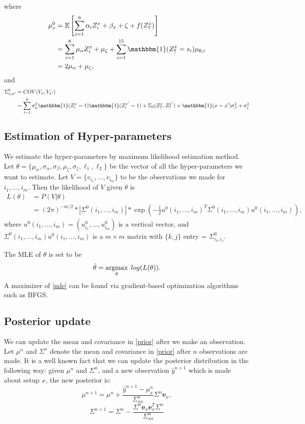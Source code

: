 \documentclass[11pt]{article}
\newcommand{\argmax}{\operatornamewithlimits{argmax}}
\begin{document}
where 
\begin{align*}
\mu^0_x &= \mathbb{E}\left[\sum_{i=1}^{6}\alpha_i Z_i^x + \beta_x + \zeta + f(Z_7^x)\right]\\
& = \sum_{i=1}^{6} \mu_{\alpha}Z^x_i+\mu_{\zeta}+\sum_{i=1}^{15}\mathbbm{1}(Z_7^x=s_i)\mu_{0,i}\\
& = 2\mu_{\alpha} + \mu_{\zeta},
\end{align*}
and
\begin{align*}
\Sigma^0_{x,x'} &= COV(V_x,V_{x'})\\
& =\sum_{i=1}^{6}\sigma_{\alpha}^2\mathbbm{1}(Z_i^{x}=1)\mathbbm{1}(Z_i^{x'}=1) + \Sigma_0(Z^x_7,Z^{x'}_7) + \mathbbm{1}(x=x')\sigma_{\beta}^2 + \sigma^2_{\zeta}
\end{align*}
\subsection{Estimation of Hyper-parameters}
We estimate the hyper-parameters by maximum likelihood estimation method. Let $\theta = \{\mu_{\alpha},\sigma_{\alpha}, \sigma_{\beta},\mu_{\zeta}, \sigma_{\zeta}, \ell_1, \ell_2\}$ be the vector of all the hyper-parameters we want to estimate. Let $V = \{v_{i_1},...,v_{i_m}\}$ to be the observations we made for $i_1,...,i_m$. Then the likelihood of $V$ given $\theta$ is 
\begin{align*}
L(\theta) &= P(V|\theta) \\
&= (2\pi)^{-m/2}*|\Sigma^0(i_1,...,i_m)|*\exp\left(-\frac{1}{2}u^0(i_1,...,i_m)^T\Sigma^0(i_1,...,i_m)u^0(i_1,...,i_m)\right),
\end{align*}
where $u^0(i_1,...,i_m) = (u^0_{i_1},...,u^0_{i_m})$ is a vertical vector, and $\Sigma^0(i_1,...,i_m)u^0(i_1,...,i_m)$ is a $m \times m$ matrix with $\{k,j\}$ entry = $\Sigma^0_{i_k, i_j}$.

The MLE of $\theta$ is set to be
\begin{equation}\label{mle}
\hat{\theta} = \argmax_{\theta}\hspace{1mm}log(L(\theta)).
\end{equation}
A maximizer of \eqref{mle} can be found via gradient-based optimization algorithms such as BFGS.  
\subsection{Posterior update}
We can update the mean and covariance in \eqref{prior} after we make an observation. Let $\mu^n$ and $\Sigma^n$ denote the mean and covariance in \eqref{prior} after $n$ observations are made. It is a well known fact that we can update the posterior distribution in the following way: given $\mu^n$ and $\Sigma^n$, and a new observation $\hat{y}^{n+1}$ which is made about setup $x$, the new posterior is:
\begin{equation}
\mu^{n+1} = \mu^n + \frac{\hat{y}^{n+1}-\mu_x^n}{\Sigma_{xx}^n}\Sigma^n\mathbf{e}_x,
\end{equation}
\begin{equation}
\Sigma^{n+1} = \Sigma^{n} - \frac{\Sigma^n\mathbf{e}_x \mathbf{e}_x^T\Sigma^n}{\Sigma_{xx}^n}
\end{equation}
\end{document}
